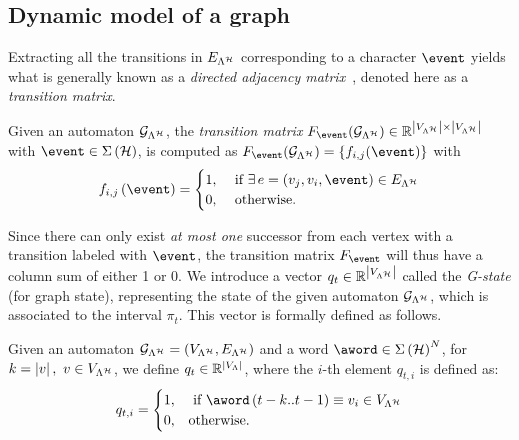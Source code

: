 \subsection{Dynamic model of a graph}
\label{ssec:dynamicgraph}

Extracting all the transitions in $E_{\Lambda^{\mathcal{H}}}$ corresponding to a character $\event$ yields what is generally known as a \emph{directed adjacency matrix}~\cite{xu2012matrix}, denoted here as a \emph{transition matrix}.
\begin{definition}%
    \label{def:transition}%
    Given an automaton $\mathcal{G}_{\Lambda^{\mathcal{H}}}$, the \emph{transition matrix} $F_{\event} ( \GG{\Lambda^\strat} ) \in \R^{\abs{\VV{\Lambda^\strat}} \times \abs{\VV{\Lambda^\strat}}}$ with $\event\in\Sigma\left(\strat\right)$, is computed as $F_{\event} ( \GG{\Lambda^\strat} ) = \{f_{i,j}(\event)\}$ with
    \begin{equation*}
        f_{i,j}\funof{\event}=
        \begin{cases}
            1, &\text{ if } \exists \, e=(v_j,v_i,\event) \in \EE{\Lambda^\strat} \\
            0, &\text{ otherwise.}
        \end{cases}
        \end{equation*}%
\end{definition}
%
Since there can only exist \emph{at most one} successor from each vertex with a transition labeled with $\event$, the transition matrix $F_\event$ will thus have a column sum of either 1 or 0.
We introduce a vector $q_t\in \mathbb{R}^{\left|V_{\Lambda^{\mathcal{H}}}\right|}$ called the \emph{G-state} (for graph state), representing the state of the given automaton $\mathcal{G}_{\Lambda^{\mathcal{H}}}$, which is associated to the interval $\pi_t$.
This vector is formally defined as follows.
\begin{definition}[G-state $q_t$]%
    \label{def:qt}%
    Given an automaton $\mathcal{G}_{\Lambda^{\mathcal{H}}} = (V_{\Lambda^{\mathcal{H}}}, E_{\Lambda^{\mathcal{H}}})$ and a word $\aword \in \Sigma\left( \strat \right)^N$, for $k = \left|v\right|,\,\, v\in V_{\Lambda^{\mathcal{H}}}$, we define $q_t\in \mathbb{R}^{\left|V_{\Lambda}\right|}$, where the $i$-th element $q_{t,i}$ is defined as:
    \begin{equation*}
        q_{t,i}=
        \begin{cases}
            1, &\text{ if } \aword\left(t-k..t-1\right) \equiv v_i \in \VV{\Lambda^\strat} \\
            0, &\text{otherwise}.
        \end{cases}
    \end{equation*}
\end{definition}
